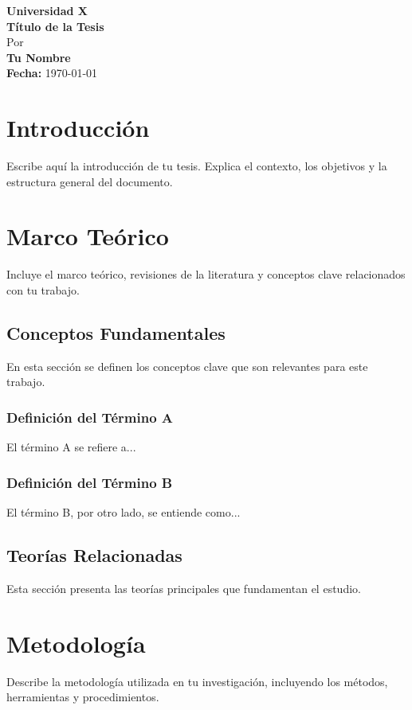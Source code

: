 \documentclass[12pt]{report}
\begin{document}
\begin{titlepage}
    \centering
    {\Large \textbf{Universidad X}}\\[2cm]
    {\Huge \textbf{Título de la Tesis}}\\[1.5cm]
    {\large Por}\\[0.5cm]
    {\Large \textbf{Tu Nombre}}\\[2cm]
    \vfill
    {\large \textbf{Fecha:} \today}
\end{titlepage}

\tableofcontents
\newpage

\chapter{Introducción}
Escribe aquí la introducción de tu tesis. Explica el contexto, los objetivos y la estructura general del documento.

\chapter{Marco Teórico}
Incluye el marco teórico, revisiones de la literatura y conceptos clave relacionados con tu trabajo.
\section{Conceptos Fundamentales}
En esta sección se definen los conceptos clave que son relevantes para este trabajo. 

\subsection{Definición del Término A}
El término A se refiere a...

\subsection{Definición del Término B}
El término B, por otro lado, se entiende como...

\section{Teorías Relacionadas}
Esta sección presenta las teorías principales que fundamentan el estudio.
\chapter{Metodología}
Describe la metodología utilizada en tu investigación, incluyendo los métodos, herramientas y procedimientos.
\end{document}
